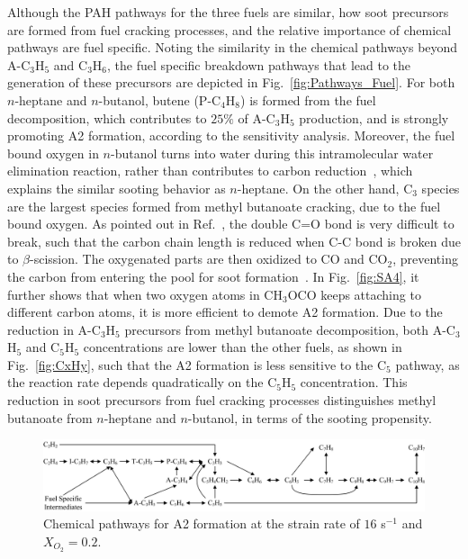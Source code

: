 \documentclass[preprint,3p,times,twocolumn]{elsarticleUS}
\begin{document}
Although the PAH pathways for the three fuels are similar, how soot precursors are formed from fuel cracking processes, and the relative importance of chemical pathways are fuel specific. Noting the similarity in the chemical pathways beyond A-C$_3$H$_5$ and C$_3$H$_6$, the fuel specific breakdown pathways that lead to the generation of these precursors are depicted in Fig.~\ref{fig:Pathways_Fuel}. For both $n$-heptane and $n$-butanol, butene (P-C$_4$H$_8$) is formed from the fuel decomposition, which contributes to $25\%$ of A-C$_3$H$_5$ production, and is strongly promoting A2 formation, according to the sensitivity analysis. Moreover, the fuel bound oxygen in $n$-butanol turns into water during this intramolecular water elimination reaction, rather than contributes to carbon reduction~\cite{mcenally05,mcenally11}, which explains the similar sooting behavior as $n$-heptane. On the other hand, C$_3$ species are the largest species formed from methyl butanoate cracking, due to the fuel bound oxygen. As pointed out in Ref.~\cite{westbrook06}, the double C=O bond is very difficult to break, such that the carbon chain length is reduced when C-C bond is broken due to $\beta$-scission. The oxygenated parts are then oxidized to CO and CO$_2$, preventing the carbon from entering the pool for soot formation~\cite{feng12,wangyl11}. In Fig.~\ref{fig:SA4}, it further shows that when two oxygen atoms in CH$_3$OCO keeps attaching to different carbon atoms, it is more efficient to demote A2 formation. Due to the reduction in A-C$_3$H$_5$ precursors from methyl butanoate decomposition, both A-C$_3$H$_5$ and C$_5$H$_5$ concentrations are lower than the other fuels, as shown in Fig.~\ref{fig:CxHy}, such that the A2 formation is less sensitive to the C$_5$ pathway, as the reaction rate depends quadratically on the C$_5$H$_5$ concentration. This reduction in soot precursors from fuel cracking processes distinguishes methyl butanoate from $n$-heptane and $n$-butanol, in terms of the sooting propensity.

\begin{figure}[h]
  \centering
  \scriptsize
  \includegraphics[width=1.0\textwidth]{Pathways-PAH.png}
  \normalsize
  \caption{Chemical pathways for A2 formation at the strain rate of $16$ s$^{-1}$ and $X_{O_2}=0.2$.}
  \label{fig:Pathways_PAH}
\end{figure}
\end{document}
